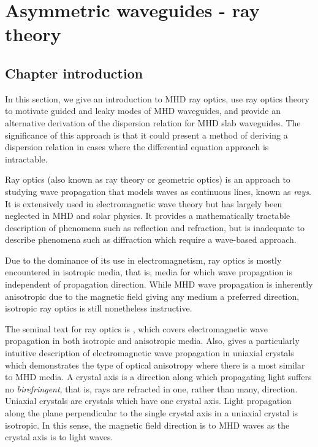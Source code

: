 
\chapter{Asymmetric waveguides - ray theory}
\label{chap: ray}

\section{Chapter introduction}
\label{sec: ray intro}

	In this section, we give an introduction to MHD ray optics, use ray optics theory to motivate guided and leaky modes of MHD waveguides, and provide an alternative derivation of the dispersion relation for MHD slab waveguides. The significance of this approach is that it could present a method of deriving a dispersion relation in cases where the differential equation approach is intractable.
	
	Ray optics (also known as ray theory or geometric optics) is an approach to studying wave propagation that models waves as continuous lines, known as \textit{rays}. It is extensively used in electromagnetic wave theory but has largely been neglected in MHD and solar physics. It provides a mathematically tractable description of phenomena such as reflection and refraction, but is inadequate to describe phenomena such as diffraction which require a wave-based approach.
	
	Due to the dominance of its use in electromagnetism, ray optics is mostly encountered in isotropic media, that is, media for which wave propagation is independent of propagation direction. While MHD wave propagation is inherently anisotropic due to the magnetic field giving any medium a preferred direction, isotropic ray optics is still nonetheless instructive.
	
	The seminal text for ray optics is \cite{bor_etal99}, which covers electromagnetic wave propagation in both isotropic and anisotropic media. Also, \cite{vei_etal10} gives a particularly intuitive description of electromagnetic wave propagation in uniaxial crystals which demonstrates the type of optical anisotropy where there is a most similar to MHD media. A crystal axis is a direction along which propagating light suffers no \textit{birefringent}, that is, rays are refracted in one, rather than many, direction. Uniaxial crystals are crystals which have one crystal axis. Light propagation along the plane perpendicular to the single crystal axis in a uniaxial crystal is isotropic. In this sense, the magnetic field direction is to MHD waves as the crystal axis is to light waves. 
	
